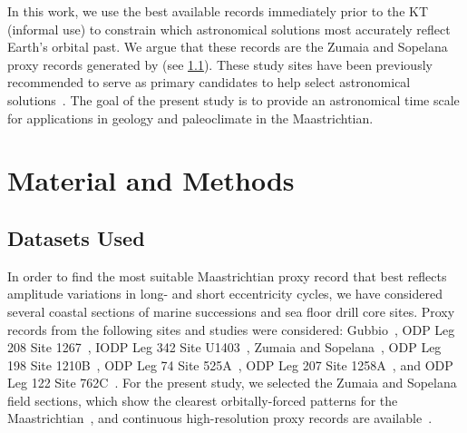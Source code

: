 \documentclass[draft]{agujournal2019}
\newcommand{\ma}[1]{Ma\(_{405}\)#1} %
\newcommand{\rez}{\textcolor{magenta}}
\newcommand{\ijk}{\textcolor{blue}}
\begin{document}
In this work, we use the best available records immediately prior to the \gls{KT} (informal use) to constrain which astronomical solutions most accurately reflect Earth's orbital past.
We argue that these records are the Zumaia and Sopelana proxy records generated by  (see \cref{sec:data}).
These study sites have been previously recommended to serve as primary candidates to help select astronomical solutions~\cite{Dinares-Turell2013}.
The goal of the present study is to provide an astronomical time scale for applications in geology and paleoclimate in the Maastrichtian.


\section{Material and Methods}\label{sec:mm}


\subsection{Datasets Used}\label{sec:data}

In order to find the most suitable Maastrichtian proxy record that best reflects amplitude variations in long- and short eccentricity cycles,
we have considered several coastal sections of marine successions and sea floor drill core sites.
Proxy records from the following sites and studies were considered:
Gubbio~\cite{Voigt2012,Sinnesael2016}, %
ODP Leg 208 Site 1267~\cite{Westerhold2008,Husson2011}, %
IODP Leg 342 Site U1403~\cite{Batenburg2018}, %
Zumaia and Sopelana~\cite{tenKateSprenger1993,Batenburg2012,Batenburg2014,Dinares-Turell2013}, %
ODP Leg 198 Site 1210B~\cite{Jung2012,Kim2022}, %
ODP Leg 74 Site 525A~\cite{Husson2011}, %
ODP Leg 207 Site 1258A~\cite{Husson2011}, %
and ODP Leg 122 Site 762C~\cite{Husson2011,Thibault2012}. %
For the present study, we selected the Zumaia and Sopelana
field sections,
which show the clearest orbitally-forced patterns for the Maastrichtian~\cite{tenKateSprenger1993,Batenburg2012,Dinares-Turell2013},
and continuous high-resolution proxy records are available~\cite{Batenburg2012,Batenburg2014}.
\end{document}
